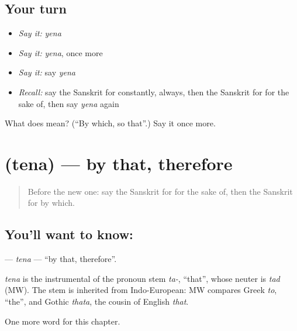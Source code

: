 \subsection*{Your turn}
\begin{itemize}
\raggedright
  \item \emph{Say it:} \emph{yena}
  \item \emph{Say it:} \emph{yena}, once more
  \item \emph{Say it:} say \emph{yena}
  \item \emph{Recall:} say the Sanskrit for constantly, always, then the Sanskrit for for the sake of, then say \emph{yena} again
\end{itemize}

\begin{tcolorbox}[breakable,colback=teal!4,colframe=teal!35!black,title={Before you move on}]
What does  mean? (\textquotedblleft{}By which, so that\textquotedblright{}.) Say it once more.
\end{tcolorbox}
\section[\texorpdfstring{\sk{तेन} (tena)}{तेन (tena)}]{ (tena) — by that, therefore}

\label{lesson:SA-C241-tena}



\begin{quote}
Before the new one: say the Sanskrit for for the sake of, then the Sanskrit for by which.
\end{quote}

\subsection*{You'll want to know: }
\textbf{} — \emph{tena} — \textquotedblleft{}by that, therefore\textquotedblright{}.

\begin{cousinweb}
\emph{tena} is the instrumental of the pronoun stem \emph{ta-}, \textquotedblleft{}that\textquotedblright{}, whose neuter is \emph{tad} (MW). The stem is inherited from Indo-European: MW compares Greek \emph{to}, \textquotedblleft{}the\textquotedblright{}, and Gothic \emph{thata}, the cousin of English \emph{that}.
\end{cousinweb}

\begin{grammarlens}[title={What you've built}]
One more word for this chapter.
\end{grammarlens}

